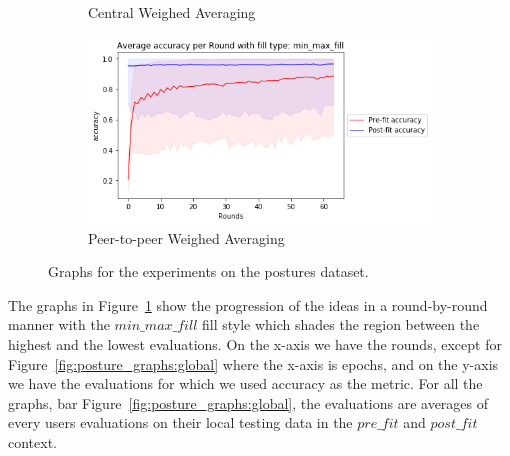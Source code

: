 \documentclass[12pt]{article}
\begin{document}
\begin{figure}[H]
\begin{subfigure}{0.45\textwidth}
    \caption{Central Weighed Averaging}
\end{subfigure}
\begin{subfigure}{0.45\textwidth}
    \raggedleft
    \includegraphics[width=\textwidth]{resources/posture_weightround_p2p-stdsplit-accuracy.png}
    \caption{Peer-to-peer Weighed Averaging}
\end{subfigure}
\caption{Graphs for the experiments on the postures dataset.}
\label{fig:posture_graphs}
\end{figure}
\noindent The graphs in Figure~\ref{fig:posture_graphs} show the progression of the ideas in a round-by-round manner with the $min\_max\_fill$ fill style which shades the region between the highest and the lowest evaluations. On the x-axis we have the rounds, except for Figure~\ref{fig:posture_graphs:global} where the x-axis is epochs, and on the y-axis we have the evaluations for which we used accuracy as the metric. For all the graphs, bar Figure~\ref{fig:posture_graphs:global}, the evaluations are averages of every users evaluations on their local testing data in the $pre\_fit$ and $post\_fit$ context. 
\\\\
\end{document}
